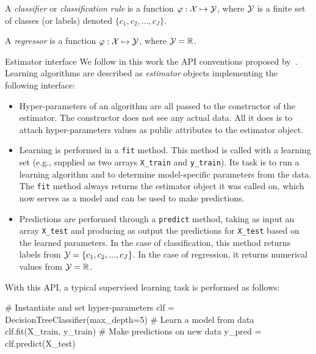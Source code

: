 \begin{definition}
A \emph{classifier} or \emph{classification rule} is a function $\varphi: {\cal X}
\mapsto {\cal Y}$, where ${\cal Y}$ is a finite set of classes (or labels) denoted $\{c_1, c_2, ..., c_J\}$\label{ntn:J}\label{ntn:c_k}.
\end{definition}

\begin{definition}
A \emph{regressor} is a function $\varphi: {\cal X} \mapsto {\cal Y}$, where ${\cal Y}=\mathbb{R}$.
\end{definition}

\begin{remark}{Estimator interface}
We follow in this work the API conventions proposed by~\citet{buitinck:2013}.
Learning algorithms are described as \textit{estimator} objects implementing the
following interface:

\begin{itemize}
\item Hyper-parameters of an algorithm are all passed to the constructor of the
estimator. The constructor does not see any actual data. All it does
is to attach hyper-parameters values as public attributes to the estimator object.
\item Learning is performed in a \texttt{fit} method. This method is called with
a learning set (e.g., supplied as two arrays \texttt{X\_train} and \texttt{y\_train}). Its
task is to run a learning algorithm and to determine model-specific parameters
from the data. The \texttt{fit} method always returns the estimator object
it was called on, which now serves as a model and can be used to make predictions.
\item Predictions are performed through a \texttt{predict} method, taking
as input an array \texttt{X\_test} and producing as output the predictions for
\texttt{X\_test} based on the learned parameters. In the case of classification,
this method returns labels from ${\cal Y} = \{c_1, c_2, ..., c_J\}$. In the case of regression,
it returns numerical values from ${\cal Y} = \mathbb{R}$.
\end{itemize}

With this API, a typical supervised learning task is performed as follows:

\vskip0.3cm
\begin{pythoncode}
# Instantiate and set hyper-parameters
clf = DecisionTreeClassifier(max_depth=5)
# Learn a model from data
clf.fit(X_train, y_train)
# Make predictions on new data
y_pred = clf.predict(X_test)
\end{pythoncode}
\end{remark}


